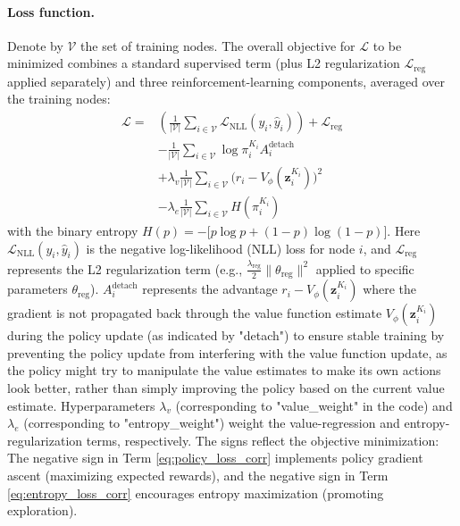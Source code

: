 \documentclass{gdl}
\begin{document}
\paragraph{Loss function.}
Denote by $\mathcal{V}$ the set of training nodes. The overall objective for $\mathcal{L}$ to be minimized combines a standard supervised term (plus L2 regularization $\mathcal{L}_{\text{reg}}$ applied separately) and three reinforcement-learning components, averaged over the training nodes:
\begin{align}
\mathcal{L} = &\left( \frac{1}{|\mathcal{V}|} \sum_{i\in\mathcal{V}} \mathcal{L}_{\text{NLL}}(y_i, \hat{y}_i) \right) + \mathcal{L}_{\text{reg}} \label{eq:supervised_loss_corr}\\
 &- \frac{1}{|\mathcal{V}|} \sum_{i\in\mathcal{V}} \log\pi_{i}^{K_i} A_i^{\text{detach}} \label{eq:policy_loss_corr}\\
 &+ \lambda_v \frac{1}{|\mathcal{V}|} \sum_{i\in\mathcal{V}} \bigl(r_i - V_{\phi}(\mathbf{z}_i^{K_i})\bigr)^2 \label{eq:value_loss_corr}\\
 &- \lambda_e \frac{1}{|\mathcal{V}|} \sum_{i\in\mathcal{V}} H(\pi_i^{K_i}) \label{eq:entropy_loss_corr}
\end{align}
with the binary entropy $H(p)= -\bigl[p\log p + (1-p)\log(1-p)\bigr]$. Here $\mathcal{L}_{\text{NLL}}(y_i, \hat{y}_i)$ is the negative log-likelihood (NLL) loss for node $i$, and $\mathcal{L}_{\text{reg}}$ represents the L2 regularization term (e.g., $\frac{\lambda_{\text{reg}}}{2} \lVert\theta_{\text{reg}}\rVert^2$ applied to specific parameters $\theta_{\text{reg}}$). $A_i^{\text{detach}}$ represents the advantage $r_i - V_{\phi}(\mathbf{z}_i^{K_i})$ where the gradient is not propagated back through the value function estimate $V_{\phi}(\mathbf{z}_i^{K_i})$ during the policy update (as indicated by "detach") to ensure stable training by preventing the policy update from interfering with the value function update, as the policy might try to manipulate the value estimates to make its own actions look better, rather than simply improving the policy based on the current value estimate. Hyperparameters $\lambda_v$ (corresponding to "value\_weight" in the code) and $\lambda_e$ (corresponding to "entropy\_weight") weight the value-regression and entropy-regularization terms, respectively. The signs reflect the objective minimization: The negative sign in Term \ref{eq:policy_loss_corr} implements policy gradient ascent (maximizing expected rewards), and the negative sign in Term \ref{eq:entropy_loss_corr} encourages entropy maximization (promoting exploration).
    
\end{document}
